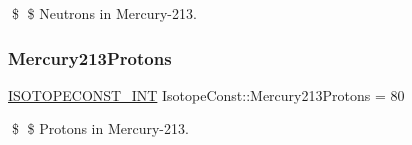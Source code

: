 \$ \$ Neutrons in Mercury-\/213. \mbox{\label{group___isotope_const-_mercury-_hg213_ga4c6e4d109f717e7e306521d815e3abb9}} 
\subsubsection{\texorpdfstring{Mercury213\+Protons}{Mercury213Protons}}
{\footnotesize\ttfamily \mbox{\hyperlink{group___isotope_const-_macros_ga5f18360b3e99483a35c32d789e62621c}{I\+S\+O\+T\+O\+P\+E\+C\+O\+N\+S\+T\+\_\+\+I\+NT}} Isotope\+Const\+::\+Mercury213\+Protons = 80}

\$ \$ Protons in Mercury-\/213. 